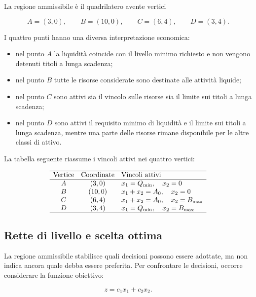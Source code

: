 La regione ammissibile \`e il quadrilatero avente vertici

\[
A=(3,0),
\qquad
B=(10,0),
\qquad
C=(6,4),
\qquad
D=(3,4).
\]

I quattro punti hanno una diversa interpretazione economica:

\begin{itemize}

\item nel punto $A$ la liquidit\`a coincide con il livello minimo richiesto e
non vengono detenuti titoli a lunga scadenza;

\item nel punto $B$ tutte le risorse considerate sono destinate alle
attivit\`a liquide;

\item nel punto $C$ sono attivi sia il vincolo sulle risorse sia il limite sui
titoli a lunga scadenza;

\item nel punto $D$ sono attivi il requisito minimo di liquidit\`a e il limite
sui titoli a lunga scadenza, mentre una parte delle risorse rimane disponibile
per le altre classi di attivo.

\end{itemize}

La tabella seguente riassume i vincoli attivi nei quattro vertici:

\[
\begin{array}{ccl}
\hline
\text{Vertice}
&
\text{Coordinate}
&
\text{Vincoli attivi}
\\
\hline
A
&
(3,0)
&
x_1=Q_{\min},\quad x_2=0
\\
B
&
(10,0)
&
x_1+x_2=A_0,\quad x_2=0
\\
C
&
(6,4)
&
x_1+x_2=A_0,\quad x_2=B_{\max}
\\
D
&
(3,4)
&
x_1=Q_{\min},\quad x_2=B_{\max}
\\
\hline
\end{array}
\]

\subsection{Rette di livello e scelta ottima}

La regione ammissibile stabilisce quali decisioni possono essere adottate, ma
non indica ancora quale debba essere preferita. Per confrontare le decisioni,
occorre considerare la funzione obiettivo:

\[
z=c_1x_1+c_2x_2.
\]

